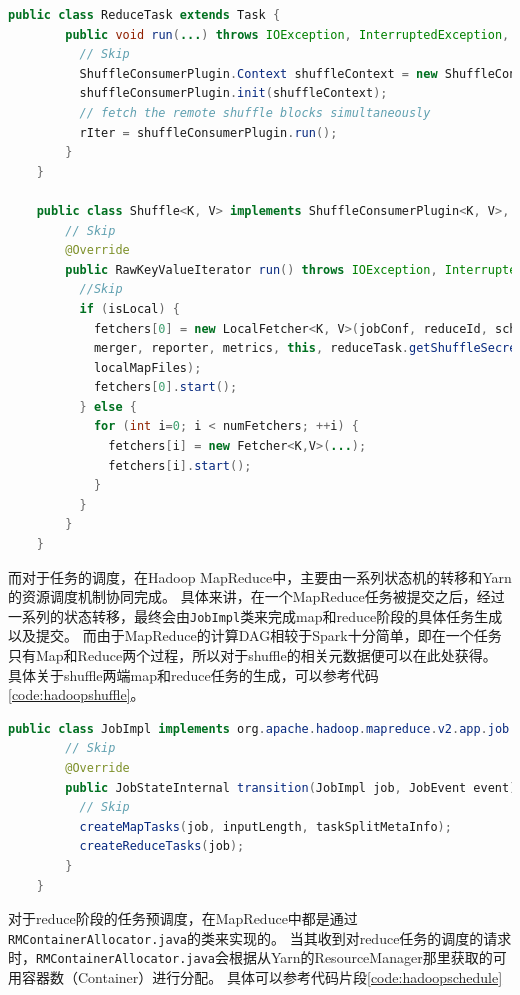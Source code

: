 \begin{lstlisting}[language={Java}, caption={Hadoop MapReduce中Reduce阶段的shuffle读代码片段}, label={code:hadoopreduce}]
    public class ReduceTask extends Task {
        public void run(...) throws IOException, InterruptedException, ClassNotFoundException {
          // Skip
          ShuffleConsumerPlugin.Context shuffleContext = new ShuffleConsumerPlugin.Context(...);
          shuffleConsumerPlugin.init(shuffleContext);
          // fetch the remote shuffle blocks simultaneously
          rIter = shuffleConsumerPlugin.run();
        }
    }

    public class Shuffle<K, V> implements ShuffleConsumerPlugin<K, V>, ExceptionReporter {
        // Skip
        @Override
        public RawKeyValueIterator run() throws IOException, InterruptedException {
          //Skip
          if (isLocal) {
            fetchers[0] = new LocalFetcher<K, V>(jobConf, reduceId, scheduler,
            merger, reporter, metrics, this, reduceTask.getShuffleSecret(),
            localMapFiles);
            fetchers[0].start();
          } else {
            for (int i=0; i < numFetchers; ++i) {
              fetchers[i] = new Fetcher<K,V>(...);
              fetchers[i].start();
            }
          }
        }
    }
\end{lstlisting}

而对于任务的调度，在Hadoop MapReduce中，主要由一系列状态机的转移和Yarn的资源调度机制协同完成。
具体来讲，在一个MapReduce任务被提交之后，经过一系列的状态转移，最终会由\verb|JobImpl|类来完成map和reduce阶段的具体任务生成以及提交。
而由于MapReduce的计算DAG相较于Spark十分简单，即在一个任务只有Map和Reduce两个过程，所以对于shuffle的相关元数据便可以在此处获得。
具体关于shuffle两端map和reduce任务的生成，可以参考代码\ref{code:hadoopshuffle}。

\begin{lstlisting}[language={Java}, caption={Hadoop MapReduce中shuffle元数据生成代码片段}, label={code:hadoopshuffle}]
    public class JobImpl implements org.apache.hadoop.mapreduce.v2.app.job.Job, EventHandler<JobEvent> {
        // Skip
        @Override
        public JobStateInternal transition(JobImpl job, JobEvent event) {
          // Skip
          createMapTasks(job, inputLength, taskSplitMetaInfo);
          createReduceTasks(job);
        }
    }
\end{lstlisting}

对于reduce阶段的任务预调度，在MapReduce中都是通过\verb|RMContainerAllocator.java|的类来实现的。
当其收到对reduce任务的调度的请求时，\verb|RMContainerAllocator.java|会根据从Yarn的ResourceManager那里获取的可用容器数（Container）进行分配。
具体可以参考代码片段\ref{code:hadoopschedule}

